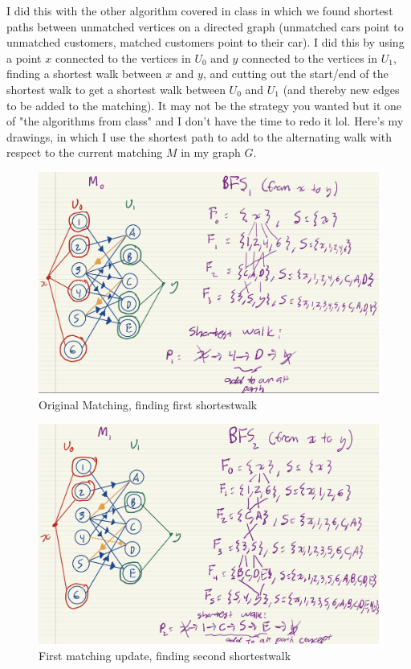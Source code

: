 \documentclass[11pt]{article}
\begin{document}
\begin{enumerate}
\begin{enumerate}
I did this with the other algorithm covered in class in which we found shortest paths between unmatched vertices on a directed graph (unmatched cars point to unmatched customers, matched customers point to their car). I did this by using a point $x$ connected to the vertices in $U_0$ and $y$ connected to the vertices in $U_1$, finding a shortest walk between $x$ and $y$, and cutting out the start/end of the shortest walk to get a shortest walk between $U_0$ and $U_1$ (and thereby new edges to be added to the matching). It may not be the strategy you wanted but it one of "the algorithms from class" and I don't have the time to redo it lol. Here's my drawings, in which I use the shortest path to add to the alternating walk with respect to the current matching $M$ in my graph $G$. \\

\begin{figure}[H]
    \centering
    \includegraphics[width=0.75\linewidth]{IMG_0136.jpg}
    \caption{Original Matching, finding first shortestwalk}
    \label{fig:enter-label}
\end{figure}

\begin{figure}[H]
    \centering
    \includegraphics[width=0.75\linewidth]{IMG_0137.jpg}
    \caption{First matching update, finding second shortestwalk}
    \label{fig:enter-label}
\end{figure}


\end{enumerate}
\end{enumerate}
\end{document}
